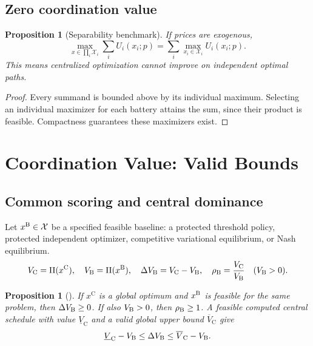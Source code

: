 \documentclass[11pt]{article}
\newtheorem{proposition}[assumption]{Proposition}
\theoremstyle{remark}
\newcommand{\X}{\mathcal X}
\newcommand{\cen}{\mathrm C}
\begin{document}
\subsection{Zero coordination value}
\begin{proposition}[Separability benchmark]
\label{prop:separable}
If prices are exogenous, 
\begin{equation}
 \max_{x\in\prod_i\X_i}\sum_iU_i(x_i;p)
       =\sum_i\max_{x_i\in\X_i}U_i(x_i;p).
 \label{eq:separable}
\end{equation}
This means centralized optimization cannot improve on independent optimal paths.
\end{proposition}
\begin{proof}
Every summand is bounded above by its individual maximum. Selecting an
individual maximizer for each battery attains the sum, since their product
is feasible. Compactness guarantees these maximizers exist.
\end{proof}



\section{Coordination Value: Valid Bounds}
\label{sec:premium}

\subsection{Common scoring and central dominance}
Let $x^{\rm B}\in\X$ be a specified feasible baseline: a protected threshold
policy, protected independent optimizer, competitive variational equilibrium,
or Nash equilibrium. 
\begin{equation}
 V_{\cen}=\Pi(x^{\cen}),\quad V_{\rm B}=\Pi(x^{\rm B}),\quad
 \Delta V_{\rm B}=V_{\cen}-V_{\rm B},\quad
 \rho_{\rm B}=\frac{V_{\cen}}{V_{\rm B}}\quad(V_{\rm B}>0).
 \label{eq:premiumdef}
\end{equation}

\begin{proposition}[]
\label{prop:dominance}
If $x^{\cen}$ is a global optimum and $x^{\rm B}$ is feasible for the same
problem, then $\Delta V_{\rm B}\ge0$. If also $V_{\rm B}>0$, then
$\rho_{\rm B}\ge1$. A feasible computed central schedule with value
$\underline V_{\cen}$ and a valid global upper bound $\overline V_{\cen}$
give
\[
 \underline V_{\cen}-V_{\rm B}\le\Delta V_{\rm B}
                    \le\overline V_{\cen}-V_{\rm B}.
\]
\end{proposition}
\end{document}
